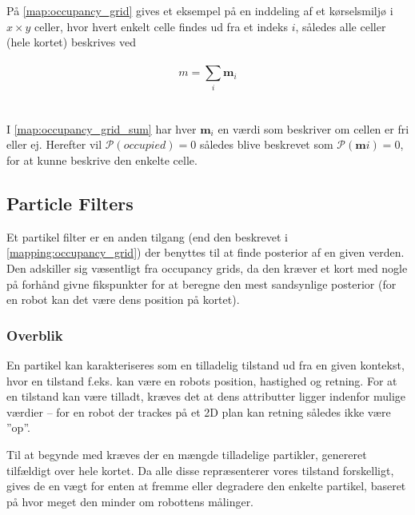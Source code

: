 På \cref{map:occupancy_grid} gives et eksempel på en inddeling af et kørselsmiljø i $x \times y$ celler, hvor hvert enkelt celle findes ud fra et indeks $i$, således alle celler (hele kortet) beskrives ved
\\\\
\begin{equation}\label{map:occupancy_grid_sum}
m = \sum\limits_{i} \mathbf{m}_{i}
\end{equation}
\\\\
I \cref{map:occupancy_grid_sum} har hver $\mathbf{m}_i$ en værdi som beskriver om cellen er fri eller ej.
Herefter vil $\mathcal{P}(occupied) = 0$ således blive beskrevet som $\mathcal{P}(\mathbf{m}i) = 0$, for at kunne beskrive den enkelte celle.

\subsection{Particle Filters}\label{mapping:particle_filter}
Et partikel filter er en anden tilgang (end den beskrevet i \cref{mapping:occupancy_grid}) der benyttes til at finde posterior af en given verden. 
Den adskiller sig væsentligt fra occupancy grids, da den kræver et kort med nogle på forhånd givne fikspunkter for at beregne den mest sandsynlige posterior (for en robot kan det være dens position på kortet).

\subsubsection{Overblik}
En partikel kan karakteriseres som en tilladelig tilstand ud fra en given kontekst, hvor en tilstand f.eks. kan være en robots position, hastighed og retning.
For at en tilstand kan være tilladt, kræves det at dens attributter ligger indenfor mulige værdier -- for en robot der trackes på et 2D plan kan retning således ikke være ''op''.

Til at begynde med kræves der en mængde tilladelige partikler, genereret tilfældigt over hele kortet.
Da alle disse repræsenterer vores tilstand forskelligt, gives de en vægt for enten at fremme eller degradere den enkelte partikel, baseret på hvor meget den 
minder om robottens målinger.

